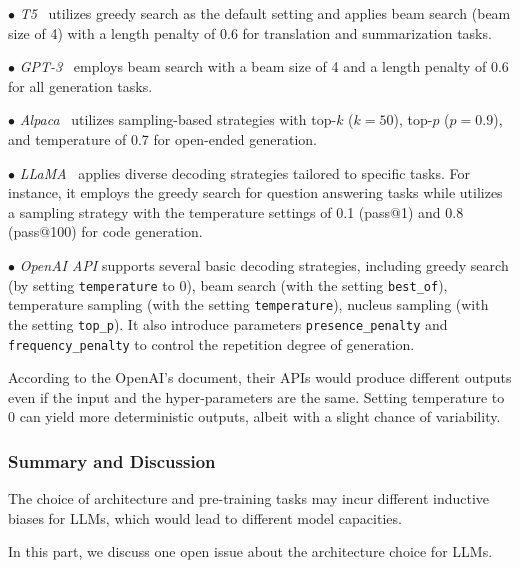 $\bullet$ \emph{T5}~\cite{Raffel-JMLR-2020-Exploring} utilizes greedy search as the default setting and applies beam search (beam size of 4) with a length penalty {of 0.6} for translation and summarization tasks.

$\bullet$ \emph{GPT-3}~\cite{Brown-NeurIPS-2020-Language} employs beam search with a beam size of 4 and a length penalty of 0.6 for all generation tasks.

$\bullet$ \emph{Alpaca}~\cite{Taori-github-2023-Stanford} utilizes sampling-based strategies {with top-$k$ ($k=50$), top-$p$  ($p=0.9$)}, and temperature of 0.7 for open-ended generation.

$\bullet$ \emph{LLaMA}~\cite{Touvron-arxiv-2023-LLaMA} applies diverse decoding strategies tailored to specific tasks. For instance, it employs the greedy search for question answering tasks while utilizes a sampling strategy with the temperature settings of 0.1 (pass@1) and 0.8 (pass@100) for code generation.

$\bullet$ \emph{OpenAI API} {supports several basic decoding strategies, including greedy search (by setting \texttt{temperature} to 0), beam search (with the setting \texttt{best\_of}), temperature sampling (with the setting \texttt{temperature}), nucleus sampling (with the setting \texttt{top\_p}). It also introduce parameters \texttt{presence\_penalty} and \texttt{frequency\_penalty} to control the repetition degree of generation.} 

{According to the OpenAI's document, their APIs would produce different outputs even if the input and the hyper-parameters are the same. Setting temperature to 0 can yield more deterministic outputs, albeit with a slight chance of variability.}

\subsubsection{Summary and Discussion}\label{sec-summary-arc}

The choice of architecture and pre-training tasks may incur different inductive biases for LLMs, which would lead to different model capacities. 

In this part, we discuss one open issue about the  architecture choice for LLMs.

\begin{center}
\begin{tcolorbox}[colback=blue!5!white,colframe=blue!55!black,width=0.48\textwidth,title={Why does Predicting the Next Word Works?}]

\end{tcolorbox}
\end{center}

